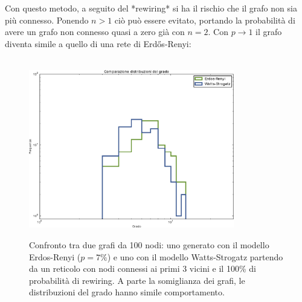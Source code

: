 Con questo metodo, a seguito del *rewiring* si ha il rischio che il grafo non sia più connesso. Ponendo $n>1$ ciò può essere evitato, portando la probabilità di avere un grafo non connesso quasi a zero già con $n=2$.
Con $p \rightarrow 1$ il grafo diventa simile a quello di una rete di Erdős-Renyi:

\begin{figure}[t!]
	\centering
	$\;$
	\\
	\subfloat
	{\includegraphics[width=0.8\textwidth]{./Immagini/Par1/ComparGradeModel}}
	\caption{Confronto tra due grafi da 100 nodi: uno generato con il modello Erdos-Renyi ($p=7\%$) e uno con il modello Watts-Strogatz partendo da un reticolo con nodi connessi ai primi 3 vicini e il 100\% di probabilit\`a di rewiring. A parte la somiglianza dei grafi, le distribuzioni del grado hanno simile comportamento.}
	\label{fig:}
\end{figure}

